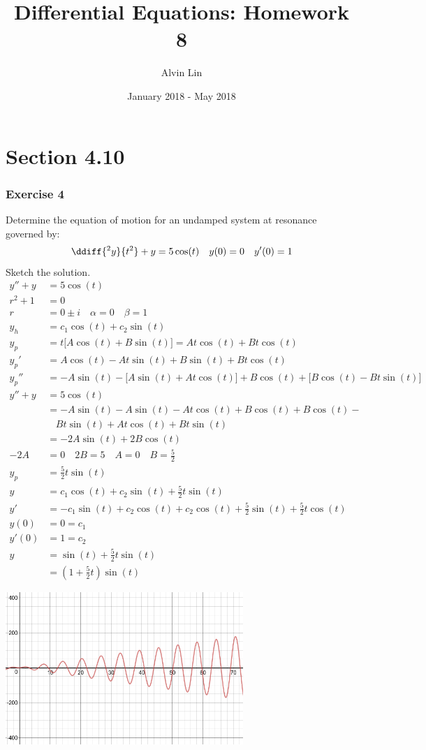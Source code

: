 \documentclass{math}
\title{Differential Equations: Homework 8}
\author{Alvin Lin}
\date{January 2018 - May 2018}
\begin{document}
\maketitle
\clearpage

\section*{Section 4.10}

\subsubsection*{Exercise 4}
Determine the equation of motion for an undamped system at resonance governed
by:
\[ \ddiff{^2y}{t^2}+y = 5\cos(t) \quad y(0) = 0 \quad y'(0) = 1 \]
Sketch the solution.
\begin{align*}
  y''+y &= 5\cos(t) \\
  r^2+1 &= 0 \\
  r &= 0\pm i \quad \alpha = 0 \quad \beta = 1 \\
  y_h &= c_1\cos(t)+c_2\sin(t) \\
  y_p &= t\bigg[A\cos(t)+B\sin(t)\bigg] = At\cos(t)+Bt\cos(t) \\
  y_p' &= A\cos(t)-At\sin(t)+B\sin(t)+Bt\cos(t) \\
  y_p'' &= -A\sin(t)-\bigg[A\sin(t)+At\cos(t)\bigg]+
    B\cos(t)+\bigg[B\cos(t)-Bt\sin(t)\bigg] \\
  y''+y &= 5\cos(t) \\
  &= -A\sin(t)-A\sin(t)-At\cos(t)+B\cos(t)+B\cos(t)- \\
  &~~~~ Bt\sin(t)+At\cos(t)+Bt\sin(t) \\
  &= -2A\sin(t)+2B\cos(t) \\
  -2A &= 0 \quad 2B = 5 \quad A = 0 \quad B = \frac{5}{2} \\
  y_p &= \frac{5}{2}t\sin(t) \\
  y &= c_1\cos(t)+c_2\sin(t)+\frac{5}{2}t\sin(t) \\
  y' &=
    -c_1\sin(t)+c_2\cos(t)+c_2\cos(t)+\frac{5}{2}\sin(t)+\frac{5}{2}t\cos(t) \\
  y(0) &= 0 = c_1 \\
  y'(0) &= 1 = c_2 \\
  y &= \sin(t)+\frac{5}{2}t\sin(t) \\
  &= (1+\frac{5}{2}t)\sin(t)
\end{align*}
\begin{center}
  \includegraphics[width=9cm]{assets/hw_09_04.png}
\end{center}
\end{document}
